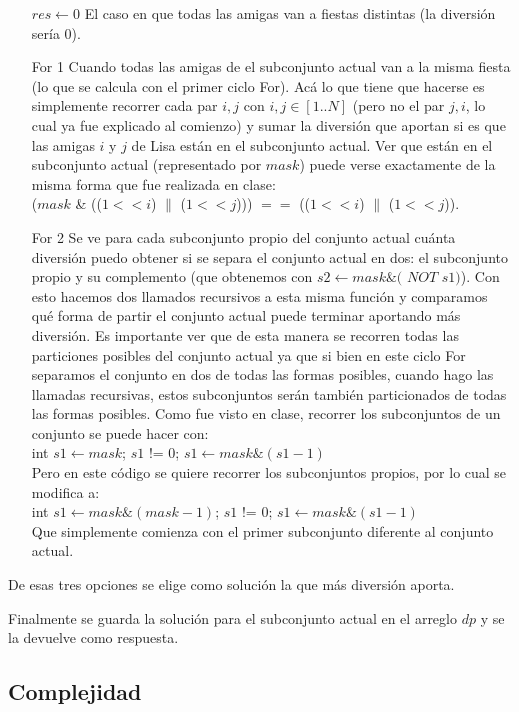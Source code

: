 \begin{itemize}
    \item [$res \gets 0$] El caso en que todas las amigas van a fiestas distintas (la diversión sería 0).
    \item [For 1] Cuando todas las amigas de el subconjunto actual van a la misma fiesta (lo que se calcula con el primer ciclo For). Acá lo que tiene que hacerse es simplemente recorrer cada par $i,j$ con $i,j \in [1..N]$ (pero no el par $j,i$, lo cual ya fue explicado al comienzo) y sumar la diversión que aportan si es que las amigas $i$ y $j$ de Lisa están en el subconjunto actual. Ver que están en el subconjunto actual (representado por $mask$) puede verse exactamente de la misma forma que fue realizada en clase: \\
    ($mask$ \& (($1 << i$) $\|$ ($1 << j$))) $==$ (($1 << i$) $\|$ ($1 << j$)).
    \item [For 2] Se ve para cada subconjunto propio del conjunto actual cuánta diversión puedo obtener si se separa el conjunto actual en dos: el subconjunto propio y su complemento (que obtenemos con $s2 \gets mask \& ($ $NOT$ $ s1)$). Con esto hacemos dos llamados recursivos a esta misma función y comparamos qué forma de partir el conjunto actual puede terminar aportando más diversión. Es importante ver que de esta manera se recorren todas las particiones posibles del conjunto actual ya que si bien en este ciclo For separamos el conjunto en dos de todas las formas posibles, cuando hago las llamadas recursivas, estos subconjuntos serán también particionados de todas las formas posibles. Como fue visto en clase, recorrer los subconjuntos de un conjunto se puede hacer con: \\
    int $s1 \gets mask$; $s1$ != $0$; $s1 \gets mask \& (s1-1)$ \\
    Pero en este código se quiere recorrer los subconjuntos propios, por lo cual se modifica a: \\
    int $s1 \gets mask \& (mask-1)$; $s1$ != $0$; $s1 \gets mask \& (s1-1)$ \\
    Que simplemente comienza con el primer subconjunto diferente al conjunto actual.
\end{itemize}

De esas tres opciones se elige como solución la que más diversión aporta.

Finalmente se guarda la solución para el subconjunto actual en el arreglo $dp$ y se la devuelve como respuesta.

\subsection{Complejidad}

